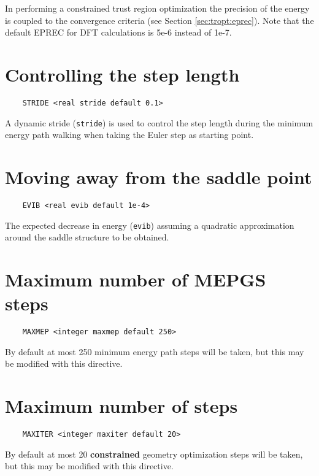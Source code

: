 In performing a constrained trust region optimization the precision of the energy is coupled to the convergence criteria (see Section \ref{sec:tropt:eprec}).
Note that the default EPREC for DFT calculations is 5e-6 instead of 1e-7.

\section{Controlling the step length}

\begin{verbatim}
    STRIDE <real stride default 0.1>
\end{verbatim}

A dynamic stride (\verb+stride+) is used to control the step length during 
the minimum energy path walking when taking the Euler step as starting point.  

\section{Moving away from the saddle point}

\begin{verbatim}
    EVIB <real evib default 1e-4>
\end{verbatim}

The expected decrease in energy (\verb+evib+) assuming a quadratic approximation around the saddle structure to be obtained. 

\section{Maximum number of MEPGS steps}

\begin{verbatim}
    MAXMEP <integer maxmep default 250>
\end{verbatim}

By default at most 250 minimum energy path steps will be taken,
but this may be modified with this directive.

\section{Maximum number of steps}

\begin{verbatim}
    MAXITER <integer maxiter default 20>
\end{verbatim}

By default at most 20 {\bf constrained} geometry optimization steps will be taken,
but this may be modified with this directive. 

